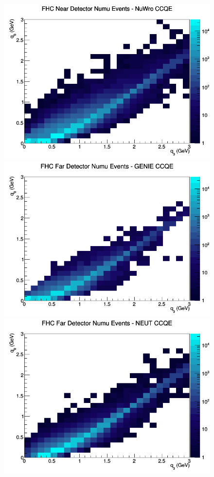 \documentclass[12pt]{article}
\begin{document}
\begin{figure}[h]
\includegraphics[width=\linewidth]{eff_q0_q3/LAr/CCQE_FHC_ND_numu_q3_q0_NuWro.png}
\endminipage
\newline
{}
\includegraphics[width=\linewidth]{eff_q0_q3/LAr/CCQE_FHC_FD_numu_q3_q0_GENIE.png}
\endminipage
{}
\includegraphics[width=\linewidth]{eff_q0_q3/LAr/CCQE_FHC_FD_numu_q3_q0_NEUT.png}

\end{figure}
\end{document}
